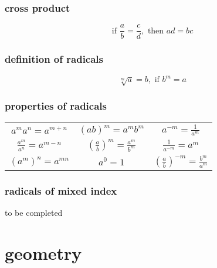 \documentclass[a4paper,12pt]{article}
\begin{document}
\subsubsection{cross product}

\[ \text{if } \frac{a}{b} = \frac{c}{d}, \text{ then } ad = bc \]

\subsubsection{definition of radicals}

\[ \sqrt[m]{a} = b, \text{ if } b^{m} = a \]

\subsubsection{properties of radicals}

\begin{center}
    \begin{tabular}{*{3}c}
        \( a^{m} a^{n} = a^{m+n} \) & \(  (ab)^{m} = a^{m} b^{m} \) & \( a^{-m}
        = \frac{1}{a^{m}} \) \\[10pt]
        \( \frac{a^{m}}{a^{n}} = a^{m-n} \) & \( \left(\frac{a}{b}\right)^{m} =
        \frac{a^{m}}{b^{m}} \) & \( \frac{1}{a^{-m}} = a^{m} \) \\[10pt]
        \( \left(a^{m}\right)^{n} = a^{mn} \) & \( a^{0} = 1 \) & \(  
        \left(\frac{a}{b}\right)^{-m} = \frac{b^{m}}{a^{m}} \)
    \end{tabular}
\end{center}

\subsubsection{radicals of mixed index}

to be completed

\section{geometry}
\end{document}
